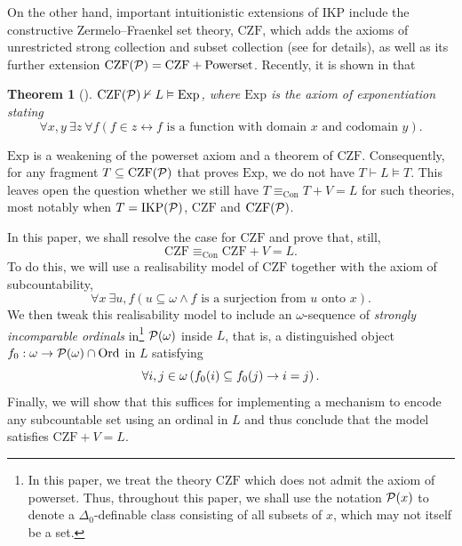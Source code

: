 \documentclass[preprint]{elsarticle}
\theoremstyle{plain}
\newtheorem{theorem}{Theorem}
\newcommand{\Ord}{\mathrm{Ord}}
\begin{document}
On the other hand, important intuitionistic extensions of $\mathrm{IKP}$ include the constructive Zermelo--Fraenkel set theory, $\mathrm{CZF}$, which adds the axioms of unrestricted strong collection and subset collection (see \cite{aczel-rathjen10-cst-book} for details), as well as its further extension $\mathrm{CZF}\mleft(\mathcal{P}\mright) = \mathrm{CZF} + \mathrm{Powerset}$. Recently, it is shown in \cite{matthews-rathjen24-constructible-universe} that
\begin{theorem}[{\cite[Theorem 7.12]{matthews-rathjen24-constructible-universe}}]
  $\mathrm{CZF}\mleft(\mathcal{P}\mright) \nvdash L \vDash \mathrm{Exp}$, where $\mathrm{Exp}$ is the axiom of exponentiation stating
  \[\forall x, y \ \exists z \ \forall f \left(f \in z \leftrightarrow \text{$f$ is a function with domain $x$ and codomain $y$}\right).\]
\end{theorem}
$\mathrm{Exp}$ is a weakening of the powerset axiom and a theorem of $\mathrm{CZF}$. Consequently, for any fragment $T \subseteq \mathrm{CZF}\mleft(\mathcal{P}\mright)$ that proves $\mathrm{Exp}$, we do not have $T \vdash L \vDash T$. This leaves open the question whether we still have $T \equiv_{\mathrm{Con}} T + V = L$ for such theories, most notably when $T = \mathrm{IKP}\mleft(\mathcal{P}\mright)$, $\mathrm{CZF}$ and $\mathrm{CZF}\mleft(\mathcal{P}\mright)$.

In this paper, we shall resolve the case for $\mathrm{CZF}$ and prove that, still,
\[\mathrm{CZF} \equiv_{\mathrm{Con}} \mathrm{CZF} + V = L.\]
To do this, we will use a realisability model of $\mathrm{CZF}$ together with the axiom of subcountability,
\[\forall x \ \exists u, f \left(u \subseteq \omega \land \text{$f$ is a surjection from $u$ onto $x$}\right).\]
We then tweak this realisability model to include an $\omega$-sequence of \emph{strongly incomparable ordinals} in\footnote{In this paper, we treat the theory $\mathrm{CZF}$ which does not admit the axiom of powerset. Thus, throughout this paper, we shall use the notation $\mathcal{P}\mleft(x\mright)$ to denote a $\Delta_0$-definable class consisting of all subsets of $x$, which may not itself be a set.} $\mathcal{P}\mleft(\omega\mright)$ inside $L$, that is, a distinguished object $f_0 : \omega \rightarrow \mathcal{P}\mleft(\omega\mright) \cap \Ord$ in $L$ satisfying
\[\forall i, j \in \omega \left(f_0\mleft(i\mright) \subseteq f_0\mleft(j\mright) \rightarrow i = j\right).\]
Finally, we will show that this suffices for implementing a mechanism to encode any subcountable set using an ordinal in $L$ and thus conclude that the model satisfies $\mathrm{CZF} + V = L$.
\end{document}
